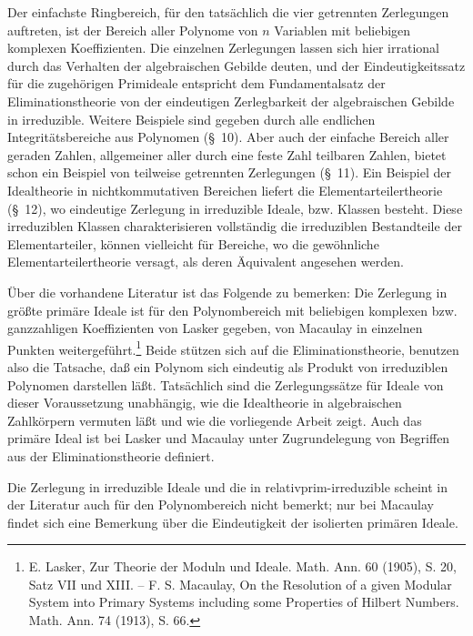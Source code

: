 \documentclass[11pt]{article}
\begin{document}
Der einfachste Ringbereich, für den tatsächlich die vier getrennten Zerlegungen auftreten, ist der Bereich aller Polynome von $n$ Variablen mit beliebigen komplexen Koeffizienten. Die einzelnen Zerlegungen lassen sich hier irrational durch das Verhalten der algebraischen Gebilde deuten, und der Eindeutigkeitssatz für die zugehörigen Primideale entspricht dem Fundamentalsatz der Eliminationstheorie von der eindeutigen Zerlegbarkeit der algebraischen Gebilde in irreduzible. Weitere Beispiele sind gegeben durch alle endlichen Integritätsbereiche aus Polynomen (\S~10). Aber auch der einfache Bereich aller geraden Zahlen, allgemeiner aller durch eine feste Zahl teilbaren Zahlen, bietet schon ein Beispiel von teilweise getrennten Zerlegungen (\S~11). Ein Beispiel der Idealtheorie in nichtkommutativen Bereichen liefert die Elementarteilertheorie (\S~12), wo eindeutige Zerlegung in irreduzible Ideale, bzw. Klassen besteht. Diese irreduziblen Klassen charakterisieren vollständig die irreduziblen Bestandteile der Elementarteiler, können vielleicht für Bereiche, wo die gewöhnliche Elementarteilertheorie versagt, als deren Äquivalent angesehen werden.

Über die vorhandene Literatur ist das Folgende zu bemerken: Die Zerlegung in größte primäre Ideale ist für den Polynombereich mit beliebigen komplexen bzw. ganzzahligen Koeffizienten von Lasker gegeben, von Macaulay in einzelnen Punkten weitergeführt.\footnote{E. Lasker, Zur Theorie der Moduln und Ideale. Math. Ann. 60 (1905), S. 20, Satz VII und XIII. -- F. S. Macaulay, On the Resolution of a given Modular System into Primary Systems including some Properties of Hilbert Numbers. Math. Ann. 74 (1913), S. 66.} Beide stützen sich auf die Eliminationstheorie, benutzen also die Tatsache, daß ein Polynom sich eindeutig als Produkt von irreduziblen Polynomen darstellen läßt. Tatsächlich sind die Zerlegungssätze für Ideale von dieser Voraussetzung unabhängig, wie die Idealtheorie in algebraischen Zahlkörpern vermuten läßt und wie die vorliegende Arbeit zeigt. Auch das primäre Ideal ist bei Lasker und Macaulay unter Zugrundelegung von Begriffen aus der Eliminationstheorie definiert.

Die Zerlegung in irreduzible Ideale und die in relativprim-irreduzible scheint in der Literatur auch für den Polynombereich nicht bemerkt; nur bei Macaulay findet sich eine Bemerkung über die Eindeutigkeit der isolierten primären Ideale.
\end{document}
